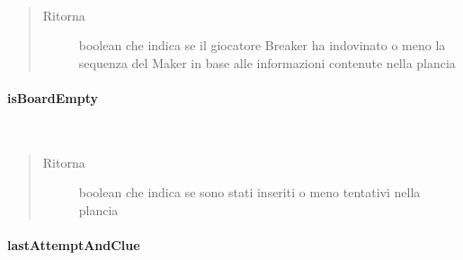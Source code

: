 \documentclass[letterpaper,10pt,italian,openany,oneside]{sphinxmanual}
\begin{document}
\begin{fulllineitems}
\label{\detokenize{source/it/unicam/cs/pa/mastermind/gamecore/BoardModel:it.unicam.cs.pa.mastermind.gamecore.BoardModel.hasBreakerGuessed()}}~\begin{quote}\begin{description}
\item[{Ritorna}] \leavevmode
boolean che indica se il giocatore Breaker ha indovinato o meno la sequenza del Maker in base alle informazioni contenute nella plancia

\end{description}\end{quote}

\end{fulllineitems}



\paragraph{isBoardEmpty}
\label{\detokenize{source/it/unicam/cs/pa/mastermind/gamecore/BoardModel:isboardempty}}

\begin{fulllineitems}
\label{\detokenize{source/it/unicam/cs/pa/mastermind/gamecore/BoardModel:it.unicam.cs.pa.mastermind.gamecore.BoardModel.isBoardEmpty()}}~\begin{quote}\begin{description}
\item[{Ritorna}] \leavevmode
boolean che indica se sono stati inseriti o meno tentativi nella plancia

\end{description}\end{quote}

\end{fulllineitems}



\paragraph{lastAttemptAndClue}
\label{\detokenize{source/it/unicam/cs/pa/mastermind/gamecore/BoardModel:lastattemptandclue}}
\end{document}

